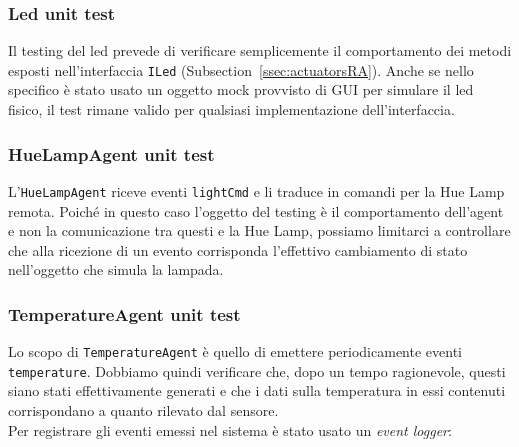 \documentclass{../llncs}
\newcommand{\codescript}[1]{{\mbox{\small{\texttt{#1}}}}\xspace}
\newcommand{\xss}[1]{\subsectionname~\ref{ssec:#1}}
\newcommand{\subsectionname}{Subsection}
\begin{document}
\subsubsection{Led unit test}
Il testing del led prevede di verificare semplicemente il comportamento dei metodi esposti nell'interfaccia \codescript{ILed} (\xss{actuatorsRA}). Anche se nello specifico è stato usato un oggetto mock provvisto di GUI per simulare il led fisico, il test rimane valido per qualsiasi implementazione dell'interfaccia.\\



\subsubsection{HueLampAgent unit test}
L'\codescript{HueLampAgent} riceve eventi \codescript{lightCmd} e li traduce in comandi per la Hue Lamp remota. Poiché in questo caso l'oggetto del testing è il comportamento dell'agent e non la comunicazione tra questi e la Hue Lamp, possiamo limitarci a controllare che alla ricezione di un evento corrisponda l'effettivo cambiamento di stato nell'oggetto che simula la lampada.\\



\subsubsection{TemperatureAgent unit test}
Lo scopo di \codescript{TemperatureAgent} è quello di emettere periodicamente eventi \codescript{temperature}. Dobbiamo quindi verificare che, dopo un tempo ragionevole, questi siano stati effettivamente generati e che i dati sulla temperatura in essi contenuti corrispondano a quanto rilevato dal sensore.\\



Per registrare gli eventi emessi nel sistema è stato usato un \emph{event logger}:\\


\end{document}
